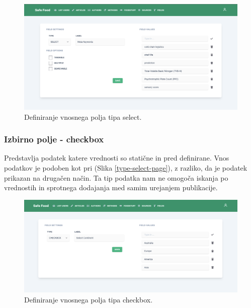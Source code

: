 \documentclass[a4paper, 12pt]{book}
\begin{document}
\begin{figure}[h]
\begin{center}
\includegraphics[width=1\textwidth]{slike/type_select.png}
\end{center}
\caption{ Definiranje vnosnega polja tipa select. }
\label{type-select}
\end{figure}


\subsubsection{Izbirno polje - checkbox}
\label{type-checkbox-page}
Predstavlja podatek katere vrednosti so statične in pred definirane. Vnos podatkov je podoben kot pri  (Slika \ref{type-select-page}), z razliko, da je podatek prikazan na drugačen način. Ta tip podatka nam ne omogoča iskanja po vrednostih in sprotnega dodajanja med samim urejanjem publikacije.

\begin{figure}[h]
\begin{center}
\includegraphics[width=1\textwidth]{slike/type_checkbox.png}
\end{center}
\caption{ Definiranje vnosnega polja tipa checkbox. }
\label{type-checkbox}
\end{figure}
\end{document}
